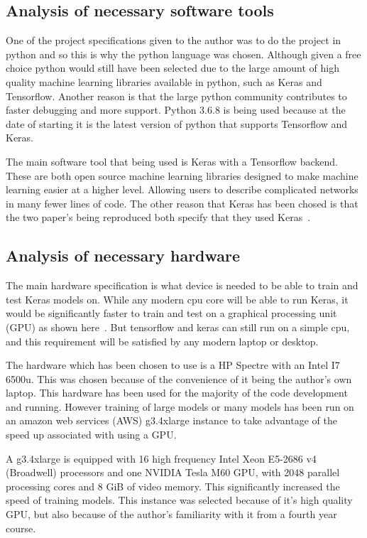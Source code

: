 \documentclass[12pt,onecolumn,letterpaper]{article}
\begin{document}
\subsection{Analysis of necessary software tools}

One of the project specifications given to the author was to do the project in python and so this is why the python language was chosen. Although given a free choice python would still have been selected due to the large amount of high quality machine learning libraries available in python, such as Keras and Tensorflow. Another reason is that the large python community contributes to faster debugging and more support. Python 3.6.8 is being used because at the date of starting it is the latest version of python that supports Tensorflow and Keras. 

The main software tool that being used is Keras with a Tensorflow backend. These are both open source machine learning libraries designed to make machine learning easier at a higher level. Allowing users to describe complicated networks in many fewer lines of code. The other reason that Keras has been chosed is that the two paper's being reproduced both specify that they used Keras~\cite{oShea,Aoudia}. 

\subsection{Analysis of necessary hardware}

The main hardware specification is what device is needed to be able to train and test Keras models on. While any modern cpu core will be able to run Keras, it would be significantly faster to train and test on a graphical processing unit (GPU) as shown here~\cite{TensorflowBenchmarking}. But tensorflow and keras can still run on a simple cpu, and this requirement will be satisfied by any modern laptop or desktop. 

The hardware which has been chosen to use is a HP Spectre with an Intel I7 6500u. This was chosen because of the convenience of it being the author's own laptop. This hardware has been used for the majority of the code development and running. However training of large models or many models has been run on an amazon web services (AWS) g3.4xlarge instance to take advantage of the speed up associated with using a GPU.

A g3.4xlarge is equipped with 16 high frequency Intel Xeon E5-2686 v4 (Broadwell) processors and one NVIDIA Tesla M60 GPU, with 2048 parallel processing cores and 8 GiB of video memory. This significantly increased the speed of training models. This instance was selected because of it's high quality GPU, but also because of the author's familiarity with it from a fourth year course.
\end{document}
